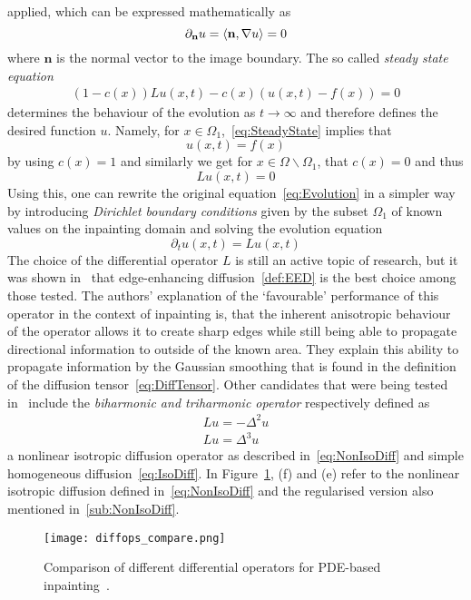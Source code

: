applied, which can be expressed mathematically as 
\begin{equation*}
    \partial_\mathbf{n}u = \langle \mathbf{n}, \mathbf{\nabla} u \rangle = 0
\end{equation*}
where $ \mathbf{n}$ is the normal vector to the image boundary.
The so called \textit{steady state equation}
\begin{align}
    (1 - c(x))Lu(x,t)- c(x)(u(x, t) - f(x)) = 0\label{eq:SteadyState}
\end{align}
determines the behaviour of the evolution as $t\to\infty$ and therefore defines the desired
function $u$. Namely, for $x\in\Omega_1$,~\eqref{eq:SteadyState} implies that 
\[ u(x,t) = f(x) \]
by using $c(x) = 1$ and similarly we get for $x\in\Omega\backslash\Omega_1$, that $c(x) = 0$ and
thus
\[ Lu(x, t) = 0 \]
Using this, one can rewrite the original equation~\eqref{eq:Evolution} in a simpler way by
introducing \textit{Dirichlet boundary conditions} given by the subset $\Omega_1$ of known values on the 
inpainting domain and solving the evolution equation
\begin{equation}
    \partial_t u(x,t) = Lu(x, t)
\end{equation}
The choice of the differential operator $L$ is still an active topic of
research, but it was shown in~\cite{schmaltz14} that edge-enhancing diffusion~\eqref{def:EED} is the best choice
among those tested.
The authors' explanation of the `favourable' performance of this operator in the context of
inpainting is, that the inherent anisotropic behaviour of the operator allows it to create sharp
edges while still being able to propagate directional information to outside of the known area.
They explain this ability to propagate information by the Gaussian smoothing that is found in the
definition of the diffusion tensor~\eqref{eq:DiffTensor}.
Other candidates that were being tested in~\cite{schmaltz14} include the \textit{biharmonic
and triharmonic operator} respectively defined as
\begin{eqnarray*}
    Lu = -\Delta^2u\\
    Lu = \Delta^3u
\end{eqnarray*}
a nonlinear isotropic diffusion operator as described in~\eqref{eq:NonIsoDiff} and simple
homogeneous diffusion~\eqref{eq:IsoDiff}.\newpage\noindent
In Figure~\ref{fig:DiffOpsCompare}, (f) and (e) refer to the nonlinear isotropic diffusion defined
in~\eqref{eq:NonIsoDiff} and the regularised version also mentioned in~\ref{sub:NonIsoDiff}.
\begin{figure}[h]
    \centering
    \texttt{[image: diffops\_compare.png]}
    \caption{Comparison of different differential operators for PDE-based
    inpainting~\cite{schmaltz14}.}\label{fig:DiffOpsCompare}
\end{figure}

